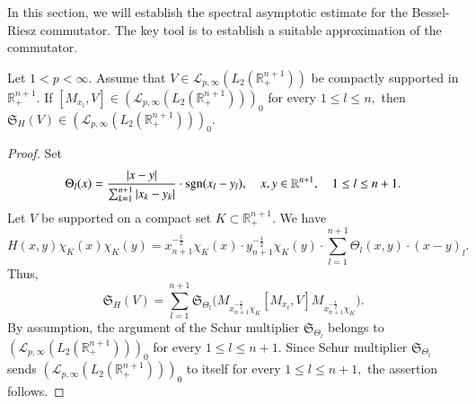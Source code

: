 \documentclass{amsart}
\begin{document}
In this section, we will establish the spectral asymptotic estimate for the Bessel-Riesz commutator. The key tool is to establish a suitable approximation of the commutator.

\begin{lemma}\label{abcde}
Let $1<p<\infty$. Assume that $V\in \mathcal{L}_{p,\infty}(L_2(\mathbb{R}^{n+1}_+))$ be compactly supported in $\mathbb{R}^{n+1}_+.$ If
$[M_{x_l},V]\in (\mathcal{L}_{p,\infty}(L_2(\mathbb{R}^{n+1}_+)))_0$ for every $1\leq l\leq n,$ then $\mathfrak{S}_H(V)\in (\mathcal{L}_{p,\infty}(L_2(\mathbb{R}^{n+1}_+)))_0.$
\end{lemma}
\begin{proof} Set
$$\Theta_l(x)=\frac{|x-y|}{\sum_{k=1}^{n+1}|x_k-y_k|}\cdot {\rm sgn}(x_l-y_l),\quad x,y\in\mathbb{R}^{n+1},\quad 1\leq l\leq n+1.$$
Let $V$ be supported on a compact set $K\subset \mathbb{R}^{n+1}_+.$ We have
$$H(x,y)\chi_K(x)\chi_K(y)=x_{n+1}^{-\frac12}\chi_K(x)\cdot y_{n+1}^{-\frac12}\chi_K(y)\cdot  \sum_{l=1}^{n+1}\Theta_l(x,y)\cdot (x-y)_l.$$
Thus,
$$\mathfrak{S}_H(V)=\sum_{l=1}^{n+1}\mathfrak{S}_{\Theta_l}\Big(M_{x_{n+1}^{-\frac12}\chi_K} [M_{x_l},V] M_{x_{n+1}^{-\frac12}\chi_K}\Big).$$
By assumption, the argument of the Schur multiplier $\mathfrak{S}_{\Theta_l}$ belongs to $(\mathcal{L}_{p,\infty}(L_2(\mathbb{R}^{n+1}_+)))_0$ for every $1\leq l\leq n+1.$ Since Schur multiplier $\mathfrak{S}_{\Theta_l}$ sends $(\mathcal{L}_{p,\infty}(L_2(\mathbb{R}^{n+1}_+)))_0$ to itself for every $1\leq l\leq n+1,$ the assertion follows.
\end{proof}
\end{document}
